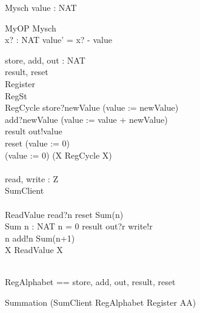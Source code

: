 
\begin{zed}
\end{zed}
\begin{schema}{Mysch}
value : NAT
\end{schema}

\begin{schema}{MyOP}
\Delta Mysch\\
x? : NAT
\where
value' = x? - value
\end{schema}

\begin{circus}
\circchannel store, add, out : NAT\\
\circchannel result, reset\\

\circprocess Register \circdef\\
	\circbegin \circstate RegSt \\
	RegCycle \circdef store?newValue \then (value := newValue)\\
	\extchoice add?newValue \then (value := value + newValue)\\
	\extchoice result \then out!value \then \Skip\\
	\extchoice reset \then (value := 0)\\
\circspot (value := 0) \circseq (\circmu X \circspot RegCycle \circseq X)\\
	\circend\\

\circchannel read, write : Z\\
\circprocess SumClient \circdef\\
	\circbegin\\
	ReadValue \circdef read?n \then reset \then Sum(n)\\
	Sum \circdef n : NAT \circspot \lcircguard n = 0 \rcircguard \circguard result \then out?r \then write!r \then \Skip\\
	\extchoice \lcircguard n  \rcircguard \circguard add!n \then Sum(n+1)\\
	\circspot \circmu X \circspot ReadValue \circseq X\\
	\circend\\

\end{circus}

\begin{circus}
\circchannelset RegAlphabet == \lchanset store, add, out, result, reset \rchanset\\
\end{circus}
\begin{circus}
\circprocess Summation \circdef (SumClient \lpar RegAlphabet \rpar Register \circhide AA)
\end{circus}